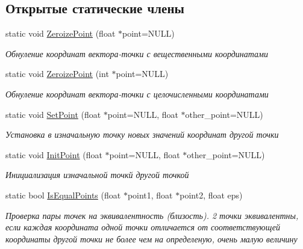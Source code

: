 \subsection*{Открытые статические члены}
\begin{DoxyCompactItemize}
\item 
static void \hyperlink{class_point_operations_a97def43827da6fe4ad1004015f62f7fb}{Zeroize\+Point} (float $\ast$point=N\+U\+L\+L)
\begin{DoxyCompactList}\small\item\em Обнуление координат вектора-\/точки с вещественными координатами \end{DoxyCompactList}\item 
static void \hyperlink{class_point_operations_a60f7b165f2a705d199f2e2932e1e3972}{Zeroize\+Point} (int $\ast$point=N\+U\+L\+L)
\begin{DoxyCompactList}\small\item\em Обнуление координат вектора-\/точки с целочисленными координатами \end{DoxyCompactList}\item 
static void \hyperlink{class_point_operations_a4f5463040b9da28ceeaa6a773dbf03da}{Set\+Point} (float $\ast$point=N\+U\+L\+L, float $\ast$other\+\_\+point=N\+U\+L\+L)
\begin{DoxyCompactList}\small\item\em Установка в изначальную точку новых значений координат другой точки \end{DoxyCompactList}\item 
static void \hyperlink{class_point_operations_af856a7ce25a39cb868725f8e25f65296}{Init\+Point} (float $\ast$point=N\+U\+L\+L, float $\ast$other\+\_\+point=N\+U\+L\+L)
\begin{DoxyCompactList}\small\item\em Инициализация изначальной точкй другой точкой \end{DoxyCompactList}\item 
static bool \hyperlink{class_point_operations_a462940940e3ee8a60089a47b67a96cb6}{Is\+Equal\+Points} (float $\ast$point1, float $\ast$point2, float eps)
\begin{DoxyCompactList}\small\item\em Проверка пары точек на эквивалентность (близость). 2 точки эквивалентны, если каждая координата одной точки отличается от соответствующей координаты другой точки не более чем на определеную, очень малую величину \end{DoxyCompactList}\item 

\end{DoxyCompactItemize}
